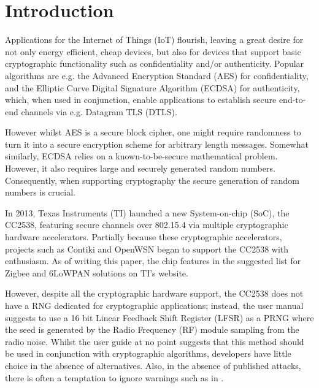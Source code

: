 \section{Introduction}
Applications for the Internet of Things (IoT) flourish, leaving a great desire for not only energy efficient, cheap devices, but also for devices that support basic cryptographic functionality such as confidentiality and/or authenticity. Popular algorithms are e.g. the Advanced Encryption Standard\cite{AES} (AES) for confidentiality, and the Elliptic Curve Digital Signature Algorithm\cite{ECDSA} (ECDSA) for authenticity, which, when used in conjunction, enable applications to establish secure end-to-end channels via e.g. Datagram TLS\cite{DTLS} (DTLS). 

However whilst AES is a secure block cipher, one might require randomness to turn it into a secure encryption scheme for arbitrary length messages. Somewhat similarly, ECDSA relies on a known-to-be-secure mathematical problem. However, it also requires large and securely generated random numbers. Consequently, when supporting cryptography the secure generation of random numbers is crucial. 


In 2013, Texas Instruments (TI) launched a new System-on-chip (SoC), the CC2538\cite{CC2538}, featuring secure channels over 802.15.4\cite{802154Standard} via multiple cryptographic hardware accelerators. Partially because these cryptographic accelerators, projects such as Contiki\cite{Contiki} and OpenWSN\cite{OpenWSN} began to support the CC2538 with enthusiasm. As of writing this paper, the chip features in the suggested list for Zigbee and 6LoWPAN solutions on TI's website\cite{ZigbeeProducts}\cite{6LowPANProducts}.

However, despite all the cryptographic hardware support, the CC2538 does not have a RNG dedicated for cryptographic applications; instead, the user manual suggests to use a 16 bit Linear Feedback Shift Register (LFSR) as a PRNG where the seed is generated by the Radio Frequency (RF) module sampling from the radio noise. Whilst the user guide at no point suggests that this method should be used in conjunction with cryptographic algorithms, developers have little choice in the absence of alternatives. Also, in the absence of published attacks, there is often a temptation to ignore warnings such as in \cite{SmartMeterBlog}. 

